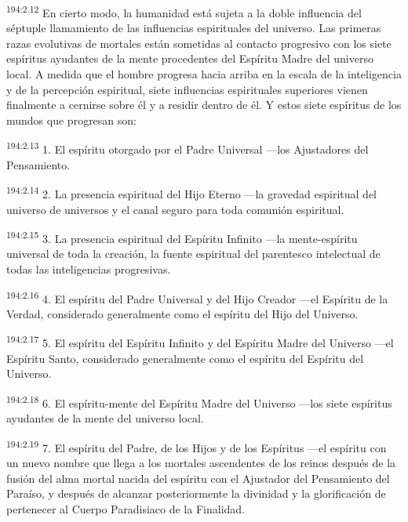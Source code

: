 \par 
\textsuperscript{194:2.12} En cierto modo, la humanidad está sujeta a la doble influencia del séptuple llamamiento de las influencias espirituales del universo. Las primeras razas evolutivas de mortales están sometidas al contacto progresivo con los siete espíritus ayudantes de la mente procedentes del Espíritu Madre del universo local. A medida que el hombre progresa hacia arriba en la escala de la inteligencia y de la percepción espiritual, siete influencias espirituales superiores vienen finalmente a cernirse sobre él y a residir dentro de él. Y estos siete espíritus de los mundos que progresan son:

\par 
\textsuperscript{194:2.13} 1. El espíritu otorgado por el Padre Universal ---los Ajustadores del Pensamiento.

\par 
\textsuperscript{194:2.14} 2. La presencia espiritual del Hijo Eterno ---la gravedad espiritual del universo de universos y el canal seguro para toda comunión espiritual.

\par 
\textsuperscript{194:2.15} 3. La presencia espiritual del Espíritu Infinito ---la mente-espíritu universal de toda la creación, la fuente espiritual del parentesco intelectual de todas las inteligencias progresivas.

\par 
\textsuperscript{194:2.16} 4. El espíritu del Padre Universal y del Hijo Creador ---el Espíritu de la Verdad, considerado generalmente como el espíritu del Hijo del Universo.

\par 
\textsuperscript{194:2.17} 5. El espíritu del Espíritu Infinito y del Espíritu Madre del Universo ---el Espíritu Santo, considerado generalmente como el espíritu del Espíritu del Universo.

\par 
\textsuperscript{194:2.18} 6. El espíritu-mente del Espíritu Madre del Universo ---los siete espíritus ayudantes de la mente del universo local.

\par 
\textsuperscript{194:2.19} 7. El espíritu del Padre, de los Hijos y de los Espíritus ---el espíritu con un nuevo nombre que llega a los mortales ascendentes de los reinos después de la fusión del alma mortal nacida del espíritu con el Ajustador del Pensamiento del Paraíso, y después de alcanzar posteriormente la divinidad y la glorificación de pertenecer al Cuerpo Paradisiaco de la Finalidad.

